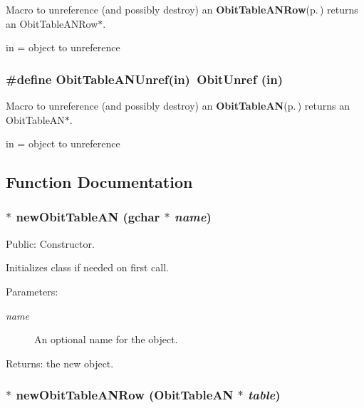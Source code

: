 Macro to unreference (and possibly destroy) an {\bf Obit\-Table\-ANRow}{\rm (p.\,\pageref{structObitTableANRow})} returns an Obit\-Table\-ANRow$\ast$. 

in = object to unreference 
\subsubsection{\setlength{\rightskip}{0pt plus 5cm}\#define Obit\-Table\-ANUnref(in)\ Obit\-Unref (in)}\label{ObitTableAN_8h_a1}


Macro to unreference (and possibly destroy) an {\bf Obit\-Table\-AN}{\rm (p.\,\pageref{structObitTableAN})} returns an Obit\-Table\-AN$\ast$. 

in = object to unreference 

\subsection{Function Documentation}
\subsubsection{$\ast$ new\-Obit\-Table\-AN (gchar $\ast$ {\em name})}\label{ObitTableAN_8h_a11}


Public: Constructor. 

Initializes class if needed on first call. \begin{Desc}
\item[Parameters:]
\begin{description}
\item[{\em name}]An optional name for the object. \end{description}
\end{Desc}
\begin{Desc}
\item[Returns:]the new object. \end{Desc}
\subsubsection{$\ast$ new\-Obit\-Table\-ANRow ({\bf Obit\-Table\-AN} $\ast$ {\em table})}\label{ObitTableAN_8h_a8}


